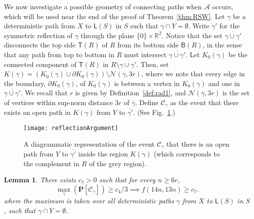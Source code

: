\documentclass[12pt, twoside,a4paper,reqno]{amsart}
\theoremstyle{plain}
\newtheorem{lemma}[theorem]{Lemma}
\theoremstyle{remark}
\theoremstyle{definition}
\newcommand{\R}{\mathbb{R}}
\newcommand{\PP}{\mathbf{P}}
\renewcommand{\P}[1]{\PP \left [ #1 \right ]}
\newcommand{\ol}{\overline}
\begin{document}
We now investigate a possible geometry of connecting paths when $\mathcal{A}$
occurs, which will be used near the end of the proof of Theorem~\ref{thm:RSW}.
Let $\gamma$ be a deterministic path from $X$ to $\mathsf L(S)$ in $S$ such that
$\gamma\cap Y=\emptyset$. Write $\gamma'$ for the symmetric reflection of
$\gamma$ through the plane $\{0\}\times\R^2$. Notice that the set
$\overline{\gamma \cup \gamma'}$ disconnects the top side $\mathsf T(R)$ of $R$
from its bottom side $\mathsf B(R)$, in the sense that any path from top to
bottom in $R$ must intersect $\overline{\gamma \cup \gamma'}$. Let $K_0(\gamma)$
be the connected component of $\mathsf T(R)$ in $R\setminus\overline{\gamma \cup
  \gamma'}$. Then, set $K(\gamma)=(K_0(\gamma) \cup \partial
K_0(\gamma))\setminus \mathcal N(\ol\gamma,3r)$, where we note that every edge in
the boundary, $\partial K_0(\gamma)$, of $K_0(\gamma)$ is between a vertex in
$K_0(\gamma)$ and one in $\overline{\gamma \cup \gamma'}$. We recall that $r$ is
given by Definition~\ref{def:rad1}, and $\mathcal N(\ol\gamma,3r)$ is the set of
vertices within sup-norm distance $3r$ of $\ol\gamma$. Define $\mathcal C_\gamma$
as the event that there exists an open path in $K(\gamma)$ from $Y$ to
$\overline{\gamma'}$. (See Fig.~\ref{fig:2}.)
\begin{figure}[htbp]
  \centering
  \texttt{[image: reflectionArgument]}
  \caption{A diagrammatic representation of the event $\mathcal C_\gamma$ that there
    is an open path from $Y$ to $\ol{\gamma'}$ inside the region $K(\gamma)$ (which
    corresponds to the complement in $R$ of the grey region).}
\label{fig:2}
\end{figure}
\begin{lemma}\label{lem:RSW3}
  There exists  $c_7>0$ such that for every $n\ge6r$,
  \begin{equation}
    \label{eq:35}
   \max_\gamma (\P{\mathcal C_{\gamma}})\ge c_4/3\implies f(14n,13n)\ge  c_7.
  \end{equation}
  where the maximum is taken over all deterministic paths $\gamma$ from $X$ to
  $\mathsf L(S)$ in $S$, such that $\gamma\cap Y=\emptyset$.
\end{lemma}
\end{document}
